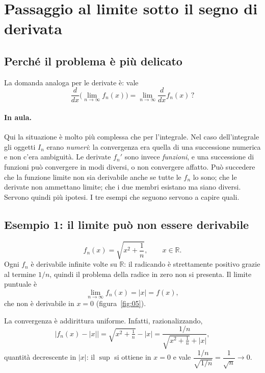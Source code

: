 
\section{Passaggio al limite sotto il segno di derivata}

\subsection{Perché il problema è più delicato}

La domanda analoga per le derivate è: vale
\[
\frac{d}{dx}\Big(\lim_{n\to\infty} f_n(x)\Big)
=\lim_{n\to\infty}\frac{d}{dx}f_n(x)\,?
\]

\paragraph{In aula.} Qui la situazione è molto più complessa che per l'integrale. Nel
caso dell'integrale gli oggetti $I_n$ erano \emph{numeri}: la convergenza era quella
di una successione numerica e non c'era ambiguità. Le derivate $f_n'$ sono invece
\emph{funzioni}, e una successione di funzioni può convergere in modi diversi, o non
convergere affatto. Può succedere che la funzione limite non sia derivabile anche se
tutte le $f_n$ lo sono; che le derivate non ammettano limite; che i due membri
esistano ma siano diversi. Servono quindi più ipotesi. I tre esempi che seguono
servono a capire quali.

\subsection{Esempio 1: il limite può non essere derivabile}

\[
f_n(x)=\sqrt{x^2+\frac{1}{n}},\qquad x\in\mathbb{R}.
\]
Ogni $f_n$ è derivabile infinite volte su $\mathbb{R}$: il radicando è strettamente
positivo grazie al termine $1/n$, quindi il problema della radice in zero non si
presenta. Il limite puntuale è
\[
\lim_{n\to\infty} f_n(x)=|x|=f(x),
\]
che non è derivabile in $x=0$ (figura~\ref{fig:05}).

La convergenza è addirittura uniforme. Infatti, razionalizzando,
\[
\big|f_n(x)-|x|\big|
=\sqrt{x^2+\tfrac1n}-|x|
=\frac{1/n}{\sqrt{x^2+\tfrac1n}+|x|},
\]
quantità decrescente in $|x|$: il $\sup$ si ottiene in $x=0$ e vale
$\dfrac{1/n}{\sqrt{1/n}}=\dfrac{1}{\sqrt n}\to 0$.

